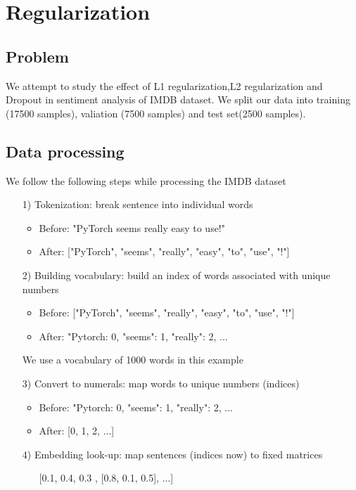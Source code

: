 \chapter{Regularization}
\section{Problem}
We attempt to study the effect of L1 regularization,L2 regularization and Dropout in sentiment analysis of IMDB dataset. We split our data into training (17500 samples), valiation (7500 samples) and test set(2500 samples).

\section{Data processing}
We follow the following steps while processing the IMDB dataset
\begin{itemize}
    \item[1)] Tokenization: break sentence into individual words
    \begin{itemize}
        \item Before: "PyTorch seems really easy to use!"
        \item After: ["PyTorch", "seems", "really", "easy", "to", "use", "!"]
    \end{itemize}
    \item[2)] Building vocabulary: build an index of words associated with unique numbers
    \begin{itemize}
        \item Before: ["PyTorch", "seems", "really", "easy", "to", "use", "!"]
        \item After: {"Pytorch: 0, "seems": 1, "really": 2, ...}
    \end{itemize}
    We use a vocabulary of 1000 words in this example
    \item[3)] Convert to numerals: map words to unique numbers (indices)
    \begin{itemize}
        \item Before: {"Pytorch: 0, "seems": 1, "really": 2, ...}
        \item After: [0, 1, 2, ...]
    \end{itemize}
    \item[4)] Embedding look-up: map sentences (indices now) to fixed matrices 
    \begin{itemize}
        \item  [[0.1, 0.4, 0.3], [0.8, 0.1, 0.5], ...]
    \end{itemize}
\end{itemize}

